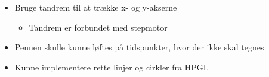 \begin{itemize}
{  
  \label{fig:plotterskitse}
}
\item Bruge tandrem til at trække x- og y-akserne
\begin{itemize}
\item Tandrem er forbundet med stepmotor
\end{itemize}
\item Pennen skulle kunne løftes på tidspunkter, hvor der ikke skal tegnes
\item Kunne implementere rette linjer og cirkler fra HPGL
\end{itemize}



